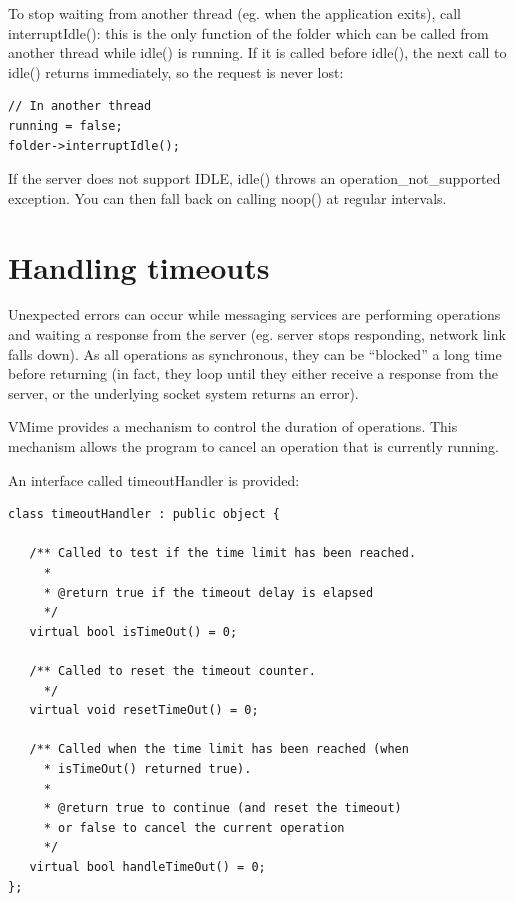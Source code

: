 To stop waiting from another thread (eg. when the application exits), call
{\vcode interruptIdle()}: this is the only function of the folder which can be
called from another thread while {\vcode idle()} is running. If it is called
before {\vcode idle()}, the next call to {\vcode idle()} returns immediately,
so the request is never lost:

\begin{lstlisting}
// In another thread
running = false;
folder->interruptIdle();
\end{lstlisting}


If the server does not support IDLE, {\vcode idle()} throws an
{\vcode operation\_not\_supported} exception. You can then fall back on calling
{\vcode noop()} at regular intervals.


\section{Handling timeouts}

Unexpected errors can occur while messaging services are performing
operations and waiting a response from the server (eg. server stops
responding, network link falls down). As all operations as synchronous,
they can be ``blocked'' a long time before returning (in fact, they loop
until they either receive a response from the server, or the underlying
socket system returns an error).

VMime provides a mechanism to control the duration of operations. This
mechanism allows the program to cancel an operation that is currently
running.

An interface called {\vcode timeoutHandler} is provided:

\begin{lstlisting}
class timeoutHandler : public object {

   /** Called to test if the time limit has been reached.
     *
     * @return true if the timeout delay is elapsed
     */
   virtual bool isTimeOut() = 0;

   /** Called to reset the timeout counter.
     */
   virtual void resetTimeOut() = 0;

   /** Called when the time limit has been reached (when
     * isTimeOut() returned true).
     *
     * @return true to continue (and reset the timeout)
     * or false to cancel the current operation
     */
   virtual bool handleTimeOut() = 0;
};
\end{lstlisting}


